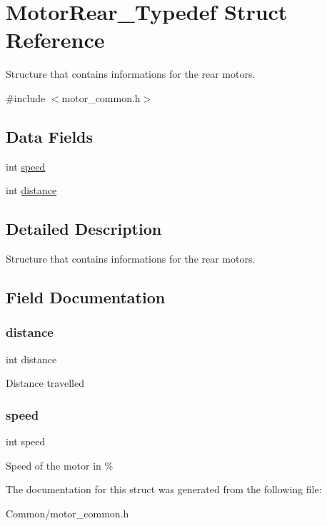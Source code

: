 \hypertarget{struct_motor_rear___typedef}{}\section{Motor\+Rear\+\_\+\+Typedef Struct Reference}
\label{struct_motor_rear___typedef}


Structure that contains informations for the rear motors.  




{\ttfamily \#include $<$motor\+\_\+common.\+h$>$}

\subsection*{Data Fields}
\begin{DoxyCompactItemize}
\item 
int \hyperlink{struct_motor_rear___typedef_a218b4f7c6cc2681a99c23a3b089d68b1}{speed}
\item 
int \hyperlink{struct_motor_rear___typedef_afb9412686cd344ad61757c1c19ba8a87}{distance}
\end{DoxyCompactItemize}


\subsection{Detailed Description}
Structure that contains informations for the rear motors. 

\subsection{Field Documentation}
\mbox{\label{struct_motor_rear___typedef_afb9412686cd344ad61757c1c19ba8a87}} 
\subsubsection{\texorpdfstring{distance}{distance}}
{\footnotesize\ttfamily int distance}

Distance travelled \mbox{\label{struct_motor_rear___typedef_a218b4f7c6cc2681a99c23a3b089d68b1}} 
\subsubsection{\texorpdfstring{speed}{speed}}
{\footnotesize\ttfamily int speed}

Speed of the motor in \% 

The documentation for this struct was generated from the following file\+:\begin{DoxyCompactItemize}
\item 
Common/motor\+\_\+common.\+h\end{DoxyCompactItemize}
